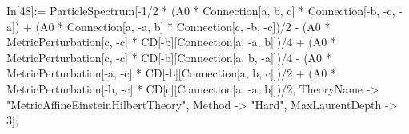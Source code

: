In[48]:= ParticleSpectrum[-1/2 * (A0 * Connection[a, b, c] * Connection[-b, -c, -a]) + (A0 * Connection[a, -a, b] * Connection[c, -b, -c])/2 - (A0 * MetricPerturbation[c, -c] * CD[-b][Connection[a, -a, b]])/4 + (A0 * MetricPerturbation[c, -c] * CD[-b][Connection[a, b, -a]])/4 - (A0 * MetricPerturbation[-a, -c] * CD[-b][Connection[a, b, c]])/2 + (A0 * MetricPerturbation[-b, -c] * CD[c][Connection[a, -a, b]])/2, TheoryName -> "MetricAffineEinsteinHilbertTheory", Method -> "Hard", MaxLaurentDepth -> 3]; 